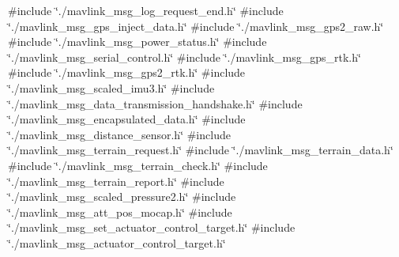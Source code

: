 {\ttfamily \#include \char`\"{}./mavlink\+\_\+msg\+\_\+log\+\_\+request\+\_\+end.\+h\char`\"{}}\newline
{\ttfamily \#include \char`\"{}./mavlink\+\_\+msg\+\_\+gps\+\_\+inject\+\_\+data.\+h\char`\"{}}\newline
{\ttfamily \#include \char`\"{}./mavlink\+\_\+msg\+\_\+gps2\+\_\+raw.\+h\char`\"{}}\newline
{\ttfamily \#include \char`\"{}./mavlink\+\_\+msg\+\_\+power\+\_\+status.\+h\char`\"{}}\newline
{\ttfamily \#include \char`\"{}./mavlink\+\_\+msg\+\_\+serial\+\_\+control.\+h\char`\"{}}\newline
{\ttfamily \#include \char`\"{}./mavlink\+\_\+msg\+\_\+gps\+\_\+rtk.\+h\char`\"{}}\newline
{\ttfamily \#include \char`\"{}./mavlink\+\_\+msg\+\_\+gps2\+\_\+rtk.\+h\char`\"{}}\newline
{\ttfamily \#include \char`\"{}./mavlink\+\_\+msg\+\_\+scaled\+\_\+imu3.\+h\char`\"{}}\newline
{\ttfamily \#include \char`\"{}./mavlink\+\_\+msg\+\_\+data\+\_\+transmission\+\_\+handshake.\+h\char`\"{}}\newline
{\ttfamily \#include \char`\"{}./mavlink\+\_\+msg\+\_\+encapsulated\+\_\+data.\+h\char`\"{}}\newline
{\ttfamily \#include \char`\"{}./mavlink\+\_\+msg\+\_\+distance\+\_\+sensor.\+h\char`\"{}}\newline
{\ttfamily \#include \char`\"{}./mavlink\+\_\+msg\+\_\+terrain\+\_\+request.\+h\char`\"{}}\newline
{\ttfamily \#include \char`\"{}./mavlink\+\_\+msg\+\_\+terrain\+\_\+data.\+h\char`\"{}}\newline
{\ttfamily \#include \char`\"{}./mavlink\+\_\+msg\+\_\+terrain\+\_\+check.\+h\char`\"{}}\newline
{\ttfamily \#include \char`\"{}./mavlink\+\_\+msg\+\_\+terrain\+\_\+report.\+h\char`\"{}}\newline
{\ttfamily \#include \char`\"{}./mavlink\+\_\+msg\+\_\+scaled\+\_\+pressure2.\+h\char`\"{}}\newline
{\ttfamily \#include \char`\"{}./mavlink\+\_\+msg\+\_\+att\+\_\+pos\+\_\+mocap.\+h\char`\"{}}\newline
{\ttfamily \#include \char`\"{}./mavlink\+\_\+msg\+\_\+set\+\_\+actuator\+\_\+control\+\_\+target.\+h\char`\"{}}\newline
{\ttfamily \#include \char`\"{}./mavlink\+\_\+msg\+\_\+actuator\+\_\+control\+\_\+target.\+h\char`\"{}}\newline
